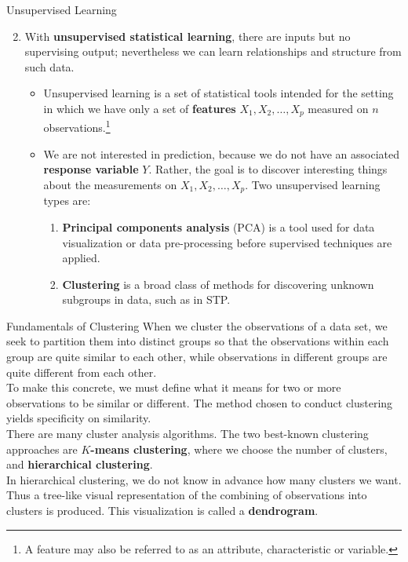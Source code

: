 \documentclass[pdf]{beamer}
\newcommand{\empr}[1]{{\color{franklinblue}\textbf{#1}}}
\theoremstyle{remark}
\theoremstyle{definition}
\begin{document}
\begin{frame}[t]{Unsupervised Learning}
\begin{enumerate}
  \setcounter{enumi}{1}
\item With \empr{unsupervised statistical learning}, there are inputs but no supervising output; nevertheless we can learn relationships and structure  from such data.
\begin{itemize}
\item Unsupervised learning is a set of statistical tools intended for the setting in which we have only a set of \empr{features} $X_1,X_2,\ldots, X_p$ measured on $n$ observations.\footnote{A feature may also be referred to as an attribute, characteristic or variable.} 
\item We are not interested in prediction, because we do not have an associated \empr{response variable} $Y$. Rather, the goal is to discover interesting things about the measurements on $X_1, X_2,\ldots,X_p$.  Two unsupervised learning types are:  
\begin{enumerate}
\item \empr{Principal components analysis} (PCA) is a tool used for data visualization or data pre-processing before supervised techniques are applied.
\item \empr{Clustering} is  a broad class of methods for discovering unknown subgroups in data, such as in STP.
\end{enumerate}
\end{itemize}
\end{enumerate}
\end{frame}

\begin{frame}[t]{Fundamentals of Clustering}
When we cluster the observations of a data set, we seek to partition them into distinct groups so that the observations within each group are quite similar to each other, while observations in different groups are quite different from each other. \\
\vspace{1.5ex}
To make this concrete, we must define what it means for two or more observations to be similar or different. The method chosen to conduct clustering yields specificity on similarity. \\
\vspace{1.5ex}
There are many cluster analysis algorithms. The two best-known clustering approaches are \empr{$K$-means clustering}, where we choose the number of clusters, and \empr{hierarchical clustering}. \\
\vspace{1.5ex}
In hierarchical clustering, we do not know in advance how many clusters we want. Thus a tree-like visual representation of the combining of observations into clusters is produced. This visualization is called a \empr{dendrogram}. 
\end{frame}
\end{document}
